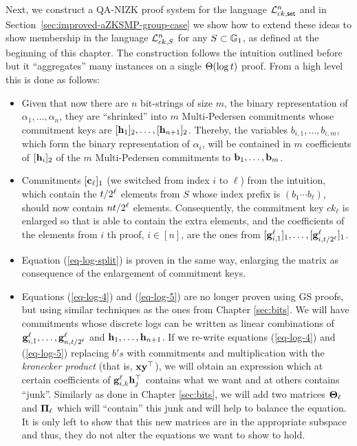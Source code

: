 Next, we construct a QA-NIZK proof system for the language
\(
\mathcal{L}_{ck,\mathsf{set}}^n
\)
and in Section~\ref{sec:improved-aZKSMP-group-case} we show how to extend these ideas to show membership in the language
\(
\mathcal{L}_{ck,S}^n\)
for any \(S\subset\mathbb{G}_1\), as defined at the beginning of this chapter.
The construction follows the intuition outlined before but it ``aggregates'' many instances on a single \(\Theta(\log t )\) proof. From a high level this is done as follows:
\begin{itemize}
\item Given that now there are \(n\) bit-strings of size \(m\), the binary representation of $\alpha_1,\ldots,\alpha_n$, they are ``shrinked'' into \(m\) Multi-Pedersen commitments whose commitment keys are \([\mathbf{h}_1]_2,\ldots,[\mathbf{h}_{n+1}]_2\). Thereby, the variables $b_{i,1},\ldots,b_{i,m}$, which form the binary representation of $\alpha_i$, will be contained in \(m\) coefficients of \([\mathbf{h}_i]_2\) of the $m$ Multi-Pedersen commitments to $\mathbf{b}_1,\ldots,\mathbf{b}_m$.
\item Commitments \([\mathbf{c}_\ell]_1\) (we switched from index \(i\) to \(\ell\)) from the intuition, which contain the \(t /2^\ell\) elements from \(S\) whose index prefix is \((b_1\cdots b_{\ell})\), should now contain \(nt /2^\ell\) elements. Consequently, the commitment key \(ck_\ell\) is enlarged so that is able to contain the extra elements, and the coefficients of the elements from \(i\) th proof, \( i\in [n]\), are the ones from \([\mathbf{g}_{i,1}^\ell]_1,\ldots,[\mathbf{g}_{i,t /2^\ell}^\ell]_1\).
\item Equation (\ref{eq-log-split}) is proven in the same way, enlarging the matrix as consequence of the enlargement of commitment keys.
\item Equations (\ref{eq-log-4}) and (\ref{eq-log-5}) are no longer proven using GS proofs, but using similar techniques as the ones from Chapter \ref{sec:bits}. We will have commitments whose discrete logs can be written as linear combinations of \(\mathbf{g}_{i,1}^\ell,\ldots,\mathbf{g}_{n,t /2^\ell}^\ell\) and \(\mathbf{h}_1,\ldots,\mathbf{h}_{n+1}\). If we re-write equations (\ref{eq-log-4}) and (\ref{eq-log-5}) replacing \(b's\) with commitments and multiplication with the \emph{kronecker product} (that is, \(\mathbf{x}\mathbf{y}^\top\)), we will obtain an expression which at certain coefficients of \(\mathbf{g}_{i,k}^\ell\mathbf{h}_j^\top\) contains what we want and at others contains ``junk''. Similarly as done in Chapter \ref{sec:bits}, we will add two matrices \(\mathbf{{\Theta}}_\ell\) and \(\mathbf{{\Pi}}_\ell\) which will ``contain'' this junk and will help to balance the equation. It is only left to show that this new matrices are in the appropriate subspace and thus, they do not alter the equations we want to show to hold.

\end{itemize}
